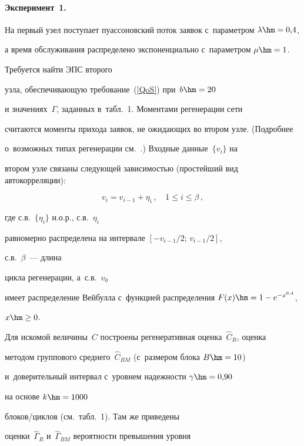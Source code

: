 \paragraph*{Эксперимент~1.}


На первый узел поступает  пуассоновский поток заявок с~параметром $\lambda\hm=0{,}4$, 


а время обслуживания распределено экспоненциально с~параметром $\mu\hm=1$. 


Требуется найти   ЭПС второго 


узла, обеспечивающую  требование~(\ref{QoS}) при~$b\hm=20$


и значениях~$\Gamma$, заданных   в~табл.~1. Моментами регенерации   сети  


считаются моменты прихода заявок, не ожидающих  во втором узле. (Подробнее 


о~возможных типах регенерации  см.~\cite{EB14,Varna}.) Входные данные~$\{v_i\}$ на 


втором узле связаны   следующей зависимостью (простейший вид автокорреляции):


\begin{equation}


v_i = v_{i-1}+\eta_i\,,\quad 1 \le i \le \beta\,,


\label{dep}


\end{equation}


 где с.в.~$\{\eta_i\}$  н.о.р.,  с.в.~$\eta_i$


 равномерно распределена на интервале $[-v_{i-1}/2;\,v_{i-1}/2]$,


  с.в.~$\beta$~---   длина


  цикла регенерации, а~с.в.~$v_0$


  имеет распределение Вейбулла с~функцией распределения $F(x) \hm= 1-e^{- x^{0,4}}$,


$x\hm\ge0$.


Для искомой величины~$C$  построены регенеративная оценка~$\hat{C}_R$, оценка 


методом группового среднего~$\hat{C}_{BM}$ (с~размером блока $B\hm=10$) 


и~доверительный интервал с~уровнем надежности $\gamma \hm= 0{,}90$ 


на основе $k\hm=1000$ 


бло\-ков/цик\-лов (см.\ табл.~1). Там же  приведены


оценки~$\hat {\Gamma}_R$ и~$\hat {\Gamma}_{BM}$  вероятности превышения  уровня 


